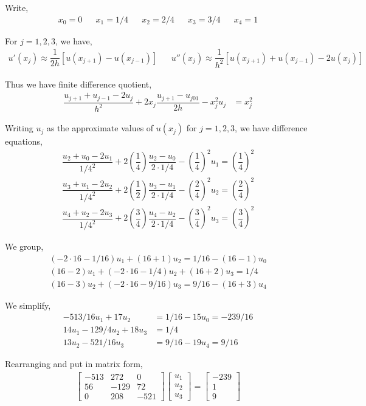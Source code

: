 \documentclass[10pt]{article}
\begin{document}
\begin{solution}[Solution]
Write,
\begin{align*}
    x_0=0 && x_1 = 1/4 && x_2 = 2/4 && x_3 = 3/4 && x_4 = 1
\end{align*}

For \( j=1,2,3 \), we have,
\begin{align*}
    u'(x_j) \approx \dfrac{1}{2h}[u(x_{j+1})-u(x_{j-1})] 
    && u''(x_j) \approx \dfrac{1}{h^2}[u(x_{j+1})+u(x_{j-1})-2u(x_j)]
\end{align*}

Thus we have finite difference quotient,
\begin{align*}
    \dfrac{u_{j+1}+u_{j-1}-2u_j}{h^2} + 2x_j \dfrac{u_{j+1}-u_{j01}}{2h} - x_j^2 u_j
    &= x_j^2
\end{align*}

Writing \( u_j \) as the approximate values of \( u(x_j) \) for \( j=1,2,3 \), we have difference equations,
\begin{align*}
    \dfrac{u_2+u_0-2u_1}{1/4^2}+2 \left( \dfrac{1}{4} \right) \dfrac{u_2-u_0}{2\cdot 1/4} - \left( \dfrac{1}{4} \right)^2u_1
    = \left(\dfrac{1}{4}\right)^2 \\
    \dfrac{u_3+u_1-2u_2}{1/4^2}+2 \left( \dfrac{1}{2} \right) \dfrac{u_3-u_1}{2\cdot 1/4} - \left( \dfrac{2}{4} \right)^2u_2
    = \left(\dfrac{2}{4}\right)^2 \\
    \dfrac{u_4+u_2-2u_3}{1/4^2}+2 \left( \dfrac{3}{4} \right) \dfrac{u_4-u_2}{2\cdot 1/4} - \left( \dfrac{3}{4} \right)^2u_3 
    = \left(\dfrac{3}{4}\right)^2
\end{align*}

We group,
\begin{align*}
    (-2\cdot 16-1/16)u_1 + (16+1)u_2 = 1/16 - (16-1)u_0 \\
    (16-2)u_1 + (-2\cdot 16-1/4)u_2 + (16+2)u_3 = 1/4 \\
    (16-3)u_2 + (-2\cdot 16-9/16)u_3 = 9/16 - (16+3)u_4
\end{align*}

We simplify,
\begin{align*}
    - 513/16 u_1 + 17u_2 &= 1/16 - 15u_0 = -239/16 \\
    14u_1 - 129/4u_2  + 18u_3 &= 1/4 \\
    13u_2 - 521/16 u_3 &= 9/16-19u_4 = 9/16
\end{align*}

Rearranging and put in matrix form,
\begin{align*}
    \left[\begin{array}{rrr} -513 & 272 & 0 \\ 56 & -129 & 72 \\ 0 & 208 & -521 \end{array}\right]
    \left[\begin{array}{r}u_1 \\ u_2 \\ u_3\end{array}\right]
    =
    \left[\begin{array}{r} -239 \\ 1 \\ 9\end{array}\right]
\end{align*}


\end{solution}
\end{document}

